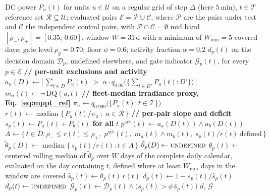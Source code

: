 \begin{algorithm*}[!t]
\caption{\textsc{vat-v1}: continuous saturation deficit}
\label{alg:mppt_deficit}
\begin{algorithmic}[1]
\Require DC power $P_u(t)$ for units $u \in \mathcal{U}$ on a regular grid of
step $\Delta$ (here $5$\,min), $t \in \mathcal{T}$
\Require reference set $\mathcal{R} \subseteq \mathcal{U}$; evaluated pairs
$\mathcal{E} = \mathcal{P} \cup \mathcal{C}$, where $\mathcal{P}$ are the pairs under test and $\mathcal{C}$ the independent control pairs, with $\mathcal{P} \cap \mathcal{C} = \emptyset$
\Require mid band $[\rho_-,\rho_+] = [0.35,\,0.60]$; window $W = 31$\,d with a
minimum of $W_{\min} = 5$ covered days; gate level $\rho_g = 0.70$; floor $\phi = 0.6$; activity fraction $\alpha = 0.2$
\Ensure $d_p(t)$ on the decision domain $\mathcal{D}_p$, undefined elsewhere, and
gate indicator $\mathcal{G}_p(t)$, for every $p \in \mathcal{E}$
\Statex
\State \textbf{// per-unit exclusions and activity}
  \State $a_u(D) \gets \big[\, \textstyle\sum_{t \in D} P_u(t)
\;>\; \alpha \cdot q_{0.95}\big(\{\sum_{t \in D'} P_u(t) : D'\}\big) \,\big]$ 
\EndFor
{}
  \State $m_u(t) \gets \neg\,\mathrm{DQ}(u,t)$
\EndFor
\Statex
\State \textbf{// fleet-median irradiance proxy, Eq.~\eqref{eq:mppt_ref}}
  \State $\pi_u \gets q_{0.999}\big(\{P_u(t) : t \in \mathcal{T}\}\big)$
\EndFor
{}
  \State $r(t) \gets \operatorname{median}\big\{\,P_u(t)/\pi_u \;:\; u \in \mathcal{R}\,\big\}$
\EndFor
\Statex
\State \textbf{// per-pair slope and deficit}
  \State $s_p(t) \gets P_a(t) + P_b(t)$ \textbf{ for all } $t$
  \State $p^{\mathrm{act}}(t) \gets a_a(D(t)) \wedge a_b(D(t))$
    \State $A \gets \{\, t \in D : \rho_- \le r(t) \le \rho_+,\;
p^{\mathrm{act}}(t),\; m_a(t) \wedge m_b(t),\; s_p(t)/r(t)\ \text{defined} \,\}$
      \State $\tilde\theta_p(D) \gets \operatorname{median}\{\, s_p(t)/r(t) : t \in A \,\}$
    \Else
      \State $\tilde\theta_p(D) \gets \textsc{undefined}$
    \EndIf
  \EndFor
  \State $\theta_p(t) \gets$ centered rolling median of $\tilde\theta_p$ over $W$
days of the complete daily calendar, evaluated on the day containing $t$, defined where at least $W_{\min}$ days in the window are covered 
    \State $\widehat{s}_p(t) \gets \theta_p(t)\, r(t)$
     
      \State $d_p(t) \gets 1 - s_p(t)/\widehat{s}_p(t)$
    \Else
      \State $d_p(t) \gets \textsc{undefined}$
    \EndIf
    \State $\mathcal{G}_p(t) \gets \mathcal{D}_p(t) \wedge
\big(s_p(t) > \phi\,\widehat{s}_p(t)\big)$ 
  \EndFor
\EndFor
\State \Return $d$, $\mathcal{G}$
\end{algorithmic}
\end{algorithm*}


